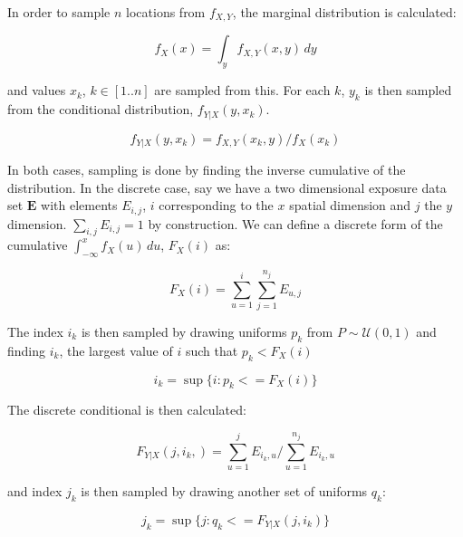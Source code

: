 \documentclass[a4paper,11pt]{extarticle} %
\theoremstyle{definition}
\begin{document}
In order to sample $n$ locations from $f_{X, Y}$, the marginal distribution is calculated:

\begin{equation}
	\label{Eq:Disagg2}
	f_X(x) = \int_{y} f_{X, Y}(x, y) \, dy
\end{equation}

and values $x_k$, $k \in [1..n]$ are sampled from this. For each $k$, $y_k$ is then sampled from the conditional distribution, $f_{Y|X}(y, x_k)$.

\begin{equation}
	\label{Eq:Disagg3}
	f_{Y|X}(y, x_k) = f_{X, Y}(x_k, y) / f_X(x_k)
\end{equation}

In both cases, sampling is done by finding the inverse cumulative of the distribution. In the discrete case, say we have a two dimensional exposure data set $\mathbf{E}$ with elements $E_{i, j}$, $i$ corresponding to the $x$ spatial dimension and $j$ the $y$ dimension. $\sum_{i,j} E_{i,j} = 1$ by construction. We can define a discrete form of the cumulative $\int_{-\infty}^{x} f_X(u) \, du$, $F_X(i)$ as:

\begin{equation}
	\label{Eq:Disagg4}
	F_X(i) = \sum_{u = 1}^{i} \sum_{j=1}^{n_j} E_{u, j}
\end{equation}	

The index $i_k$ is then sampled by drawing uniforms $p_k$ from $P \sim \mathcal{U}(0, 1)$ and finding $i_k$, the largest value of $i$ such that $p_k < F_X(i)$

\begin{equation}
	\label{Eq:Disagg4}
	i_k = \sup \{ i : p_k <= F_X(i) \}
\end{equation}	

The discrete conditional is then calculated:

\begin{equation}
	\label{Eq:Disagg5}
	F_{Y|X}(j, i_k,) = \sum_{u = 1}^{j} E_{i_k, u} / \sum_{u = 1}^{n_j} E_{i_k, u}
\end{equation}	

and index $j_k$ is then sampled by drawing another set of uniforms $q_k$:

\begin{equation}
	\label{Eq:Disagg4}
	j_k = \sup \{ j : q_k <= F_{Y|X}(j, i_k) \}
\end{equation}	

\clearpage
\printglossaries
\clearpage


%

%
\end{document}
